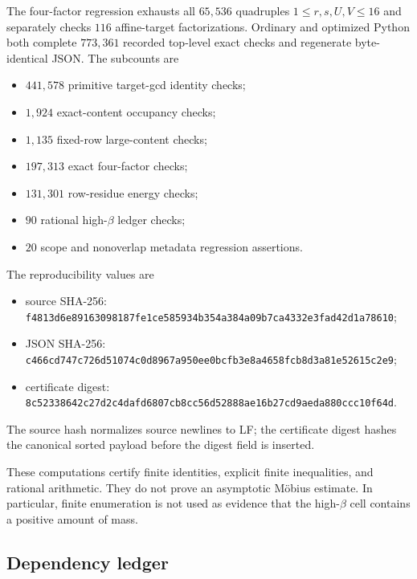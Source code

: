 The four-factor regression exhausts all $65{,}536$ quadruples
$1\le r,s,U,V\le16$ and separately checks $116$ affine-target
factorizations.  Ordinary and optimized Python both complete
$773{,}361$ recorded top-level exact checks and regenerate
byte-identical JSON.  The subcounts are
\begin{itemize}
 \item $441{,}578$ primitive target-gcd identity checks;
 \item $1{,}924$ exact-content occupancy checks;
 \item $1{,}135$ fixed-row large-content checks;
 \item $197{,}313$ exact four-factor checks;
 \item $131{,}301$ row-residue energy checks;
 \item $90$ rational high-$\beta$ ledger checks;
 \item $20$ scope and nonoverlap metadata regression assertions.
\end{itemize}
The reproducibility values are
\begin{itemize}
 \item source SHA-256:
 \nolinkurl{f4813d6e89163098187fe1ce585934b354a384a09b7ca4332e3fad42d1a78610};
 \item JSON SHA-256:
 \nolinkurl{c466cd747c726d51074c0d8967a950ee0bcfb3e8a4658fcb8d3a81e52615c2e9};
 \item certificate digest:
 \nolinkurl{8c52338642c27d2c4dafd6807cb8cc56d52888ae16b27cd9aeda880ccc10f64d}.
\end{itemize}
The source hash normalizes source newlines to LF; the certificate
digest hashes the canonical sorted payload before the digest field is
inserted.

These computations certify finite identities, explicit finite
inequalities, and rational arithmetic.  They do not prove an
asymptotic M\"obius estimate.  In particular, finite enumeration is
not used as evidence that the high-$\beta$ cell contains a positive
amount of mass.

\subsection{Dependency ledger}

